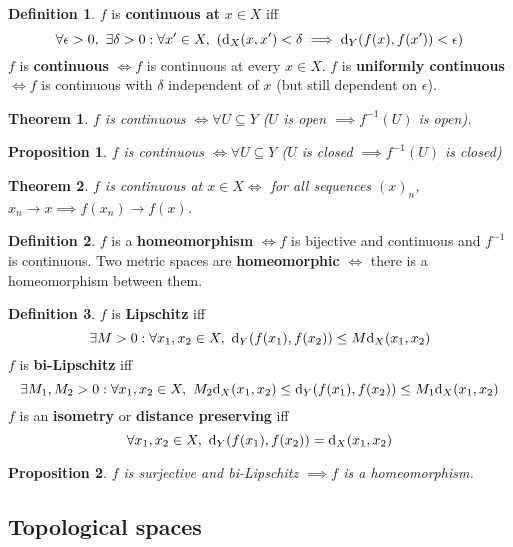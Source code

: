 \documentclass[12pt]{article}
\newtheorem{thm}{Theorem}[section]
\newtheorem*{prop*}{Proposition}
\theoremstyle{definition}
\newtheorem{defn}{Definition}[section]
\renewcommand{\d}{{\textnormal{d}}}
\begin{document}
\begin{defn}
	$f$ is \textbf{continuous at} $x \in X$ iff
	$$\forall \epsilon > 0,\ \exists \delta > 0 : \forall x' \in X,\ (\d_X(x, x') < \delta \implies \d_Y(f(x), f(x')) < \epsilon)$$
	$f$ is \textbf{continuous} $\iff f$ is continuous at every $x \in X$.
	$f$ is \textbf{uniformly continuous} $\iff f$ is continuous with $\delta$ independent of $x$ (but still dependent on $\epsilon$).
\end{defn}

\begin{thm}
	$f$ is continuous $\iff \forall U \subseteq Y$ \textnormal{(}$U$ is open $\implies f^{-1}(U)$ is open\textnormal{)}.
\end{thm}

\begin{prop*}
	$f$ is continuous $\iff \forall U \subseteq Y$ \textnormal{(}$U$ is closed $\implies f^{-1}(U)$ is closed\textnormal{)}
\end{prop*}

\begin{thm}
	$f$ is continuous at $x \in X \iff$ for all sequences $(x)_n$, $x_n \to x \implies f(x_n) \to f(x)$.
\end{thm}

\begin{defn}
	$f$ is a \textbf{homeomorphism} $\iff f$ is bijective and continuous and $f^{-1}$ is continuous.
	Two metric spaces are \textbf{homeomorphic} $\iff$ there is a homeomorphism between them.
\end{defn}

\begin{defn}
	$f$ is \textbf{Lipschitz} iff
	$$\exists M > 0 : \forall x_1, x_2 \in X,\ \d_Y(f(x_1), f(x_2)) \leq M\d_X(x_1, x_2)$$
	$f$ is \textbf{bi-Lipschitz} iff
	$$\exists M_1, M_2 > 0 : \forall x_1, x_2 \in X,\ M_2\d_X(x_1, x_2) \leq \d_Y(f(x_1), f(x_2)) \leq M_1\d_X(x_1, x_2)$$
	$f$ is an \textbf{isometry} or \textbf{distance preserving} iff
	$$\forall x_1, x_2 \in X,\ \d_Y(f(x_1), f(x_2)) = \d_X(x_1, x_2)$$
\end{defn}

\begin{prop*}
	$f$ is surjective and bi-Lipschitz $\implies f$ is a homeomorphism.
\end{prop*}

\subsection{Topological spaces}
\end{document}
